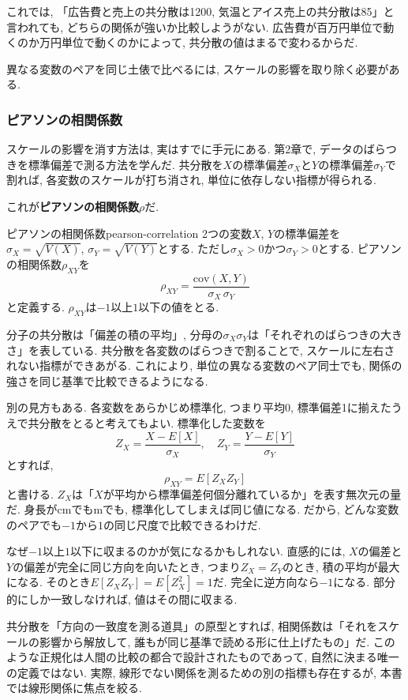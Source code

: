 これでは, 「広告費と売上の共分散は1200, 気温とアイス売上の共分散は85」と言われても, どちらの関係が強いか比較しようがない.
広告費が百万円単位で動くのか万円単位で動くのかによって, 共分散の値はまるで変わるからだ.

異なる変数のペアを同じ土俵で比べるには, スケールの影響を取り除く必要がある.

\subsubsection*{ピアソンの相関係数}

スケールの影響を消す方法は, 実はすでに手元にある.
第2章で, データのばらつきを標準偏差で測る方法を学んだ.
共分散を$X$の標準偏差$\sigma_X$と$Y$の標準偏差$\sigma_Y$で割れば, 各変数のスケールが打ち消され, 単位に依存しない指標が得られる.

これが\textbf{ピアソンの相関係数}$\rho$だ.

\begin{defi}[]{ピアソンの相関係数}{pearson-correlation}
2つの変数$X$, $Y$の標準偏差を$\sigma_X = \sqrt{V(X)}$, $\sigma_Y = \sqrt{V(Y)}$とする. ただし$\sigma_X > 0$かつ$\sigma_Y > 0$とする. ピアソンの相関係数$\rho_{XY}$を
\[
\rho_{XY} = \frac{\mathrm{cov}(X,Y)}{\sigma_X \, \sigma_Y}
\]
と定義する. $\rho_{XY}$は$-1$以上$1$以下の値をとる.
\end{defi}

分子の共分散は「偏差の積の平均」, 分母の$\sigma_X \sigma_Y$は「それぞれのばらつきの大きさ」を表している.
共分散を各変数のばらつきで割ることで, スケールに左右されない指標ができあがる.
これにより, 単位の異なる変数のペア同士でも, 関係の強さを同じ基準で比較できるようになる.

別の見方もある.
各変数をあらかじめ標準化, つまり平均0, 標準偏差1に揃えたうえで共分散をとると考えてもよい.
標準化した変数を
\[
Z_X = \frac{X - E[X]}{\sigma_X}, \quad Z_Y = \frac{Y - E[Y]}{\sigma_Y}
\]
とすれば,
\[
\rho_{XY} = E[Z_X Z_Y]
\]
と書ける.
$Z_X$は「$X$が平均から標準偏差何個分離れているか」を表す無次元の量だ.
身長がcmでもmでも, 標準化してしまえば同じ値になる.
だから, どんな変数のペアでも$-1$から$1$の同じ尺度で比較できるわけだ.

なぜ$-1$以上$1$以下に収まるのかが気になるかもしれない.
直感的には, $X$の偏差と$Y$の偏差が完全に同じ方向を向いたとき, つまり$Z_X = Z_Y$のとき, 積の平均が最大になる.
そのとき$E[Z_X Z_Y] = E[Z_X^2] = 1$だ.
完全に逆方向なら$-1$になる.
部分的にしか一致しなければ, 値はその間に収まる.

共分散を「方向の一致度を測る道具」の原型とすれば, 相関係数は「それをスケールの影響から解放して, 誰もが同じ基準で読める形に仕上げたもの」だ.
このような正規化は人間の比較の都合で設計されたものであって, 自然に決まる唯一の定義ではない.
実際, 線形でない関係を測るための別の指標も存在するが, 本書では線形関係に焦点を絞る.

